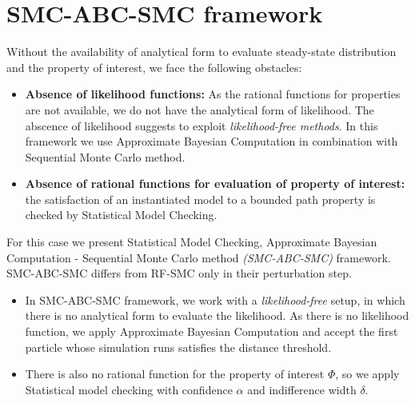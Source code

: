 \section{SMC-ABC-SMC framework}
Without the availability of analytical form to evaluate steady-state distribution and the property of
interest, we face the following obstacles:
\begin{itemize}
    \item \textbf{Absence of likelihood functions:} As the rational functions for properties are not
          available, we do not have the analytical form of likelihood. The abscence of likelihood
          suggests to exploit \textit{likelihood-free methods}. In this framework we use Approximate
          Bayesian Computation in combination with Sequential Monte Carlo method.
    \item \textbf{Absence of rational functions for evaluation of property of interest:} the
          satisfaction of an instantiated model to a bounded path property is checked by Statistical
          Model Checking.
\end{itemize}
For this case we present Statistical Model Checking, Approximate Bayesian Computation - Sequential
Monte Carlo method \textit{(SMC-ABC-SMC)} framework. SMC-ABC-SMC differs from RF-SMC only in their
perturbation step.
\begin{itemize}
    \item In SMC-ABC-SMC framework, we work with a \textit{likelihood-free} setup, in which there is
          no analytical form to evaluate the likelihood. As there is no likelihood function, we
          apply Approximate Bayesian Computation and  accept the first particle whose simulation runs
          satisfies the distance threshold.
    \item There is also no rational function for the property
          of interest $\Phi$, so we apply Statistical model checking with confidence $\alpha$ and indifference
          width $\delta$.
\end{itemize}

